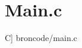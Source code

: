 \section[C program Main.c]{Main.c}\label{appdix:main} 
	\scriptsize
	 C] {broncode/main.c}
	\normalsize

